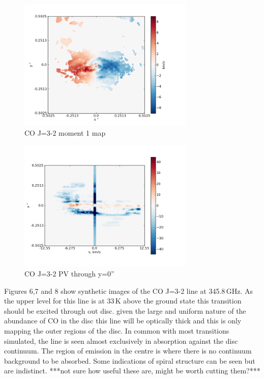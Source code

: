 \documentclass[useAMS,usenatbib]{mn2e}
\begin{document}
\begin{figure}
 \includegraphics[width=84mm]{Figures/sim/imageCO_3-2_30deg_mom1.png}

 \caption{CO J=3-2 moment 1 map}
\end{figure}

\begin{figure}
 \includegraphics[width=84mm]{Figures/sim/imageCO_3-2_30deg_PV_centre.png}

 \caption{CO J=3-2 PV through y=0''}
\end{figure}

Figures 6,7 and 8 show synthetic images of the CO J=3-2 line at 345.8$\,$GHz. As the upper level for this line is at 33$\,$K above the ground state this transition should be excited through out disc. given the large and uniform nature of the abundance of CO in the disc this line will be optically thick and this is only mapping the outer regions of the disc. In common with most transitions simulated, the line is seen almost exclusively in absorption against the disc continuum. The region of emission in the centre is where there is no continuum background to be absorbed.  Some indications of spiral structure can be seen but are indistinct. ***not sure how useful these are, might be worth cutting them?***\newline
\end{document}
